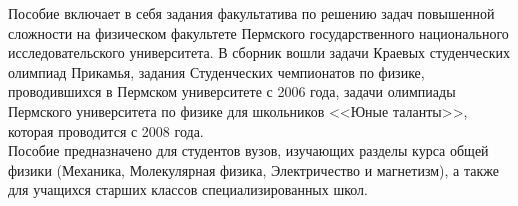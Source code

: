 Пособие включает в себя задания факультатива по решению задач повышенной сложности на физическом факультете Пермского государственного национального исследовательского университета. В сборник вошли задачи Краевых студенческих олимпиад Прикамья, задания Студенческих чемпионатов по физике, проводившихся в Пермском университете с 2006 года, задачи олимпиады Пермского университета по физике для школьников <<Юные таланты>>, которая проводится с 2008 года.  \\
\indent Пособие предназначено для студентов вузов, изучающих разделы курса общей физики (Механика, Молекулярная физика, Электричество и магнетизм), а также для учащихся старших классов специализированных школ.